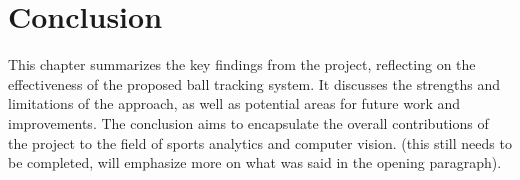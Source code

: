 \documentclass[12pt,a4paper]{article}
\begin{document}
\newpage
\section{Conclusion}
This chapter summarizes the key findings from the project, reflecting on the effectiveness of the proposed ball tracking system. It discusses the strengths and limitations of the approach, as well as potential areas for future work and improvements. The conclusion aims to encapsulate the overall contributions of the project to the field of sports analytics and computer vision. (this still needs to be completed, will emphasize more on what was said in the opening paragraph).

\newpage
\printbibliography
\end{document}
